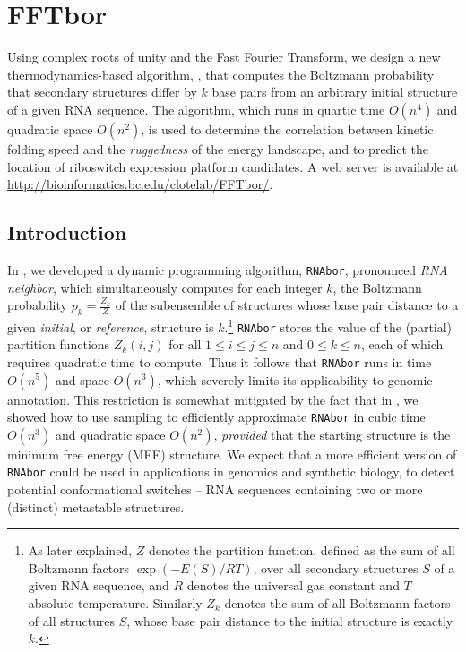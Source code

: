 
\chapter{FFTbor}

\label{FFTbor}


Using complex roots of unity and the Fast Fourier Transform, we
design a new thermodynamics-based algorithm, \fftbor, that
computes the Boltzmann probability that secondary structures differ
by $k$ base pairs from an arbitrary initial structure of a given RNA
sequence. The algorithm, which runs in quartic time $O(n^4)$ and quadratic space
$O(n^2)$, is used to determine the
correlation between kinetic folding speed and the {\em ruggedness}
of the energy landscape, and to predict the location of riboswitch
expression platform candidates. A web server is available at
\url{http://bioinformatics.bc.edu/clotelab/FFTbor/}.

\section*{Introduction}

In \cite{Freyhult.b07}, we developed a dynamic programming algorithm,
{\tt RNAbor}, pronounced {\em RNA neighbor}, which simultaneously computes for
each integer $k$, the Boltzmann probability $p_k = \frac{Z_k}{Z}$
of the subensemble of structures
whose base pair distance to a given {\em initial}, or
{\em reference}, structure \strSt is $k$.\footnote{As later
explained, $Z$ denotes the partition function, defined as the sum of
all Boltzmann factors $\exp(-E(S)/RT)$, over all secondary structures $S$
of a given RNA sequence, and $R$ denotes the  universal
gas constant and $T$ absolute temperature. Similarly $Z_k$ denotes the
sum of all Boltzmann factors of all structures $S$, whose base pair distance
to the initial structure \strSt is exactly $k$.}
{\tt RNAbor} stores the value of the (partial)
partition functions $Z_k(i,j)$ for all $1 \leq i \leq j \leq n$ and
$0 \leq k \leq n$, each of which requires quadratic time to compute.
Thus it follows that {\tt RNAbor} runs in time $O(n^5)$ and space
$O(n^3)$, which severely limits its applicability to genomic annotation.
This restriction is somewhat mitigated by the fact that
in \cite{CloteLouLorenz}, we showed how to use sampling
\cite{Ding.nar03} to efficiently approximate
{\tt RNAbor} in cubic time $O(n^3)$ and quadratic space $O(n^2)$,
{\em provided} that the starting structure \strSt is the minimum free
energy (MFE) structure. We expect that a more efficient version of
{\tt RNAbor} could be used in applications in genomics and synthetic
biology, to detect potential conformational switches --
RNA sequences containing two or more (distinct) metastable structures.

